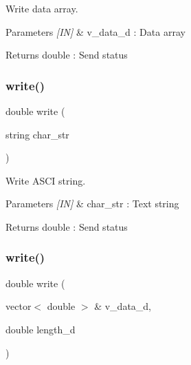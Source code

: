Write data array. 


\begin{DoxyCode}{0}
\end{DoxyCode}



\begin{DoxyParams}{Parameters}
{\em \mbox{[}\+I\+N\mbox{]}} & v\+\_\+data\+\_\+d \+: Data array \\
\hline
\end{DoxyParams}
\begin{DoxyReturn}{Returns}
double \+: Send status 
\end{DoxyReturn}
\mbox{\label{classuart_ac68442e2dbd073ee686220fe0b525662}} 
\subsubsection{write()\hspace{0.1cm}{\footnotesize\ttfamily [3/4]}}
{\footnotesize\ttfamily double write (\begin{DoxyParamCaption}\item[{string}]{char\+\_\+str }\end{DoxyParamCaption})}



Write A\+S\+CI string. 


\begin{DoxyCode}{0}
\end{DoxyCode}



\begin{DoxyParams}{Parameters}
{\em \mbox{[}\+I\+N\mbox{]}} & char\+\_\+str \+: Text string \\
\hline
\end{DoxyParams}
\begin{DoxyReturn}{Returns}
double \+: Send status 
\end{DoxyReturn}
\mbox{\label{classuart_a0be86e407bbaa1dccd550f1898dcb8ca}} 
\subsubsection{write()\hspace{0.1cm}{\footnotesize\ttfamily [4/4]}}
{\footnotesize\ttfamily double write (\begin{DoxyParamCaption}\item[{vector$<$ double $>$ \&}]{v\+\_\+data\+\_\+d,  }\item[{double}]{length\+\_\+d }\end{DoxyParamCaption})}



